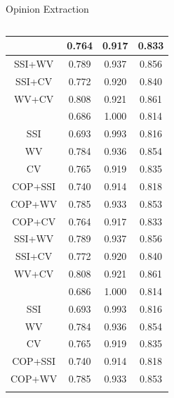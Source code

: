 \documentclass[compress]{beamer}
\begin{document}
\begin{frame}{Opinion Extraction}
\begin{columns}
\begin{column}[T]{.6\textwidth}
\begin{table}
\begin{tabular}{cccc}
{                        COP+CV     & 0.764     & 0.917  & 0.833   \\ \hline
                        SSI+WV     & 0.789     & 0.937  & 0.856   \\ \hline
                        SSI+CV     & 0.772     & 0.920  & 0.840   \\ \hline
                        WV+CV      & 0.808     & 0.921  & 0.861   \\ \hline
                    }
                    \only<2>{
                        COP        & 0.686     & 1.000  & 0.814   \\ \hline
                        SSI        & 0.693     & 0.993  & 0.816   \\ \hline
                        WV         & 0.784     & 0.936  & \cellcolor{red}0.854   \\ \hline
                        CV         & 0.765     & 0.919  & \cellcolor{green}0.835   \\ \hline
                        COP+SSI    & 0.740     & 0.914  & 0.818   \\ \hline
                        COP+WV     & 0.785     & 0.933  & \cellcolor{red}0.853   \\ \hline
                        COP+CV     & 0.764     & 0.917  & \cellcolor{green}0.833   \\ \hline
                        SSI+WV     & 0.789     & 0.937  & \cellcolor{red}0.856   \\ \hline
                        SSI+CV     & 0.772     & 0.920  & \cellcolor{green}0.840   \\ \hline
                        WV+CV      & 0.808     & 0.921  & 0.861   \\ \hline
                    }
                    \only<3>{
                        COP        & 0.686     & 1.000  & \cellcolor{green!50}0.814   \\ \hline
                        SSI        & 0.693     & 0.993  & \cellcolor{cyan!50}0.816   \\ \hline
                        WV         & 0.784     & 0.936  & \cellcolor{blue!50}0.854   \\ \hline
                        CV         & 0.765     & 0.919  & \cellcolor{blue!50}0.835   \\ \hline
                        COP+SSI    & 0.740     & 0.914  & \cellcolor{green}0.818   \\ \hline
                        COP+WV     & 0.785     & 0.933  & \cellcolor{green}0.853   \\ \hline
}
\end{tabular}
\end{table}
\end{column}
\end{columns}
\end{frame}
\end{document}
